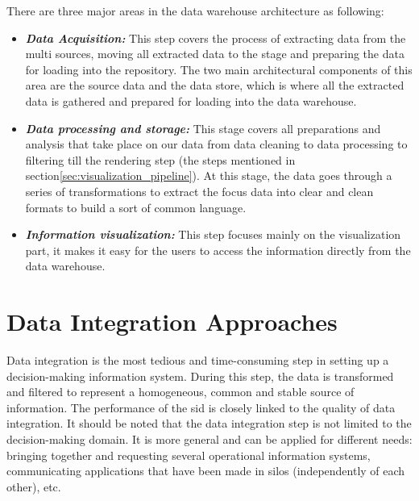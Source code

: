 There are three major areas in the data warehouse architecture as following:
\begin{itemize}
  \renewcommand{\labelitemi}{$\bullet$}
  \item \textbf{\textit{Data Acquisition:}} This step covers the process of extracting data from the multi sources, moving all extracted data to the stage and preparing the data for loading into the repository. The two main architectural components of this area are the source data and the data store, which is where all the extracted data is gathered and prepared for loading into the data warehouse.
  
  \item \textbf{\textit{Data processing and storage:}} This stage covers all preparations and analysis that take place on our data from data cleaning to data processing to filtering till the rendering step (the steps mentioned in section\ref{sec:visualization_pipeline}).
  At this stage, the data goes through a series of transformations to extract the focus data into clear and clean formats to build a sort of common language.

  \item \textbf{\textit{Information visualization:}} This step focuses mainly on the visualization part, it makes it easy for the users to access the information directly from the data warehouse.
\end{itemize}



\section{Data Integration Approaches} 
Data integration is the most tedious and time-consuming step in setting up a decision-making information system. During this step, the data is transformed and filtered to represent a homogeneous, common and stable source of information. The performance of the \gls{sid} is closely linked to the quality of data integration. It should be noted that the data integration step is not limited to the decision-making domain. It is more general and can be applied for different needs: bringing together and requesting several operational information systems, communicating applications that have been made in silos (independently of each other), etc.
 
